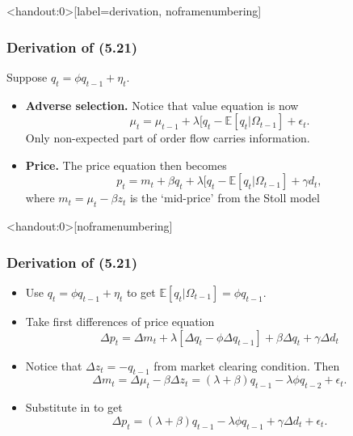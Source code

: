 \documentclass[english,10pt]{beamer}
\begin{document}
\begin{frame}<handout:0>[label=derivation, noframenumbering]
\frametitle{Derivation of (5.21)}
Suppose $q_t=\phi q_{t-1}+\eta_{t}$. 
\begin{itemize}
\item \textbf{Adverse selection.} Notice that value equation is now
\[
\mu_t=\mu_{t-1}+\lambda[q_t-\mathbb{E}[q_t|\Omega_{t-1}]+\epsilon_t.
\]
Only non-expected part of order flow carries information. 
\item \textbf{Price.} The price equation then becomes
\[
p_t=m_t+\beta q_t+\lambda[q_t-\mathbb{E}[q_t|\Omega_{t-1}]+\gamma d_t,
\]
where $m_t=\mu_t-\beta z_t$ is the `mid-price' from the Stoll model 
\end{itemize}
\end{frame}


\begin{frame}<handout:0>[noframenumbering]
\frametitle{Derivation of (5.21)}
\begin{itemize}
\item Use $q_t=\phi q_{t-1}+\eta_{t}$ to get $\mathbb{E}[q_t|\Omega_{t-1}]=\phi q_{t-1}$.
\item Take first differences of price equation
\[
\Delta p_t = \Delta m_t + \lambda [ \Delta q_t-\phi\Delta q_{t-1}]+\beta \Delta q_t+\gamma \Delta d_t
\]
\item Notice that $\Delta z_t=-q_{t-1}$ from market clearing condition. Then
\[
\Delta m_t = \Delta \mu_t-\beta \Delta z_t = (\lambda+\beta)q_{t-1}-\lambda \phi q_{t-2}+\epsilon_t.
\]
\item Substitute in to get
\[
\Delta p_t =(\lambda+\beta)q_{t-1} - \lambda\phi  q_{t-1}+\gamma \Delta d_t+\epsilon_t.
\]
\hyperlink{extending}{}
\end{itemize}
\end{frame}
\end{document}
